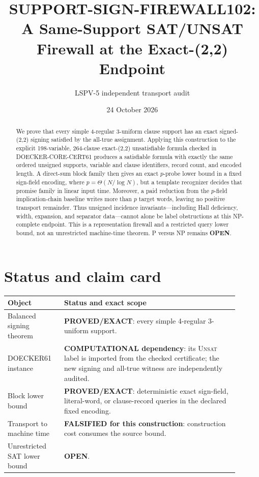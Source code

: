 \documentclass[11pt]{article}
\title{SUPPORT-SIGN-FIREWALL102:\\A Same-Support SAT/UNSAT Firewall at the Exact-(2,2) Endpoint}
\author{LSPV-5 independent transport audit}
\date{24 October 2026}
\newcommand{\unsat}{\textsc{Unsat}}
\begin{document}
\maketitle

\begin{abstract}
We prove that every simple 4-regular 3-uniform clause support has an exact signed-(2,2)
signing satisfied by the all-true assignment.  Applying this construction to the explicit
198-variable, 264-clause exact-(2,2) unsatisfiable formula checked in
DOECKER-CORE-CERT61 produces a satisfiable formula with exactly the same ordered unsigned
supports, variable and clause identifiers, record count, and encoded length.  A direct-sum
block family then gives an exact $p$-probe lower bound in a fixed sign-field encoding, where
$p=\Theta(N/\log N)$, but a template recognizer decides that promise family in linear input
time.  Moreover, a paid reduction from the $p$-field implication-chain baseline writes more
than $p$ target words, leaving no positive transport remainder.  Thus unsigned incidence
invariants---including Hall deficiency, width, expansion, and separator data---cannot alone
be label obstructions at this NP-complete endpoint.  This is a representation firewall and
a restricted query lower bound, not an unrestricted machine-time theorem.  P versus NP
remains \textbf{OPEN}.
\end{abstract}

\section{Status and claim card}

\begin{center}
\begin{tabular}{>{\raggedright\arraybackslash}p{0.22\linewidth}p{0.68\linewidth}}
\toprule
Object & Status and exact scope\\
\midrule
Balanced signing theorem & \textbf{PROVED/EXACT}: every simple 4-regular 3-uniform support.\\
DOECKER61 instance & \textbf{COMPUTATIONAL dependency}: its \unsat{} label is imported from the checked certificate; the new signing and all-true witness are independently audited.\\
Block lower bound & \textbf{PROVED/EXACT}: deterministic exact sign-field, literal-word, or clause-record queries in the declared fixed encoding.\\
Transport to machine time & \textbf{FALSIFIED for this construction}: construction cost consumes the source bound.\\
Unrestricted SAT lower bound & \textbf{OPEN}.\\
\bottomrule
\end{tabular}
\end{center}
\end{document}
